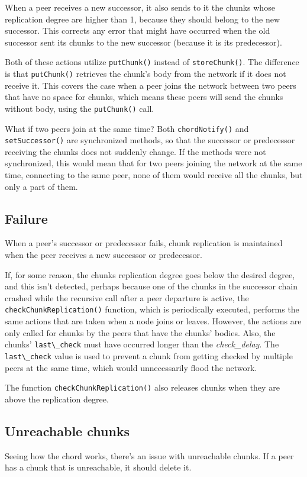 \documentclass[11pt]{article}
\begin{document}
When a peer receives a new successor, it also sends to it the chunks whose replication degree are higher than 1, because they should belong to the new successor. This corrects any error that might have occurred when the old successor sent its chunks to the new successor (because it is its predecessor). 

Both of these actions utilize \verb|putChunk()| instead of \verb|storeChunk()|. The difference is that \verb|putChunk()| retrieves the chunk's body from the network if it does not receive it. This covers the case when a peer joins the network between two peers that have no space for chunks, which means these peers will send the chunks without body, using the \verb|putChunk()| call.

What if two peers join at the same time? Both \verb|chordNotify()| and \verb|setSuccessor()| are synchronized methods, so that the successor or predecessor receiving the chunks does not suddenly change. If the methods were not synchronized, this would mean that for two peers joining the network at the same time, connecting to the same peer, none of them would receive all the chunks, but only a part of them. 

\subsection{Failure}
When a peer's successor or predecessor fails, chunk replication is maintained when the peer receives a new successor or predecessor. 

If, for some reason, the chunks replication degree goes below the desired degree, and this isn't detected, perhaps because one of the chunks in the successor chain crashed while the recursive call after a peer departure is active, the \verb|checkChunkReplication()| function, which is periodically executed, performs the same actions that are taken when a node joins or leaves. However, the actions are only called for chunks by the peers that have the chunks' bodies. Also, the chunks' \verb|last\_check| must have occurred longer than the \textit{check\_delay}. The \verb|last\_check| value is used to prevent a chunk from getting checked by multiple peers at the same time, which would unnecessarily flood the network.

The function \verb|checkChunkReplication()| also releases chunks when they are above the replication degree.

\subsection{Unreachable chunks}
Seeing how the chord works, there's an issue with unreachable chunks. If a peer has a chunk that is unreachable, it should delete it.
\end{document}
